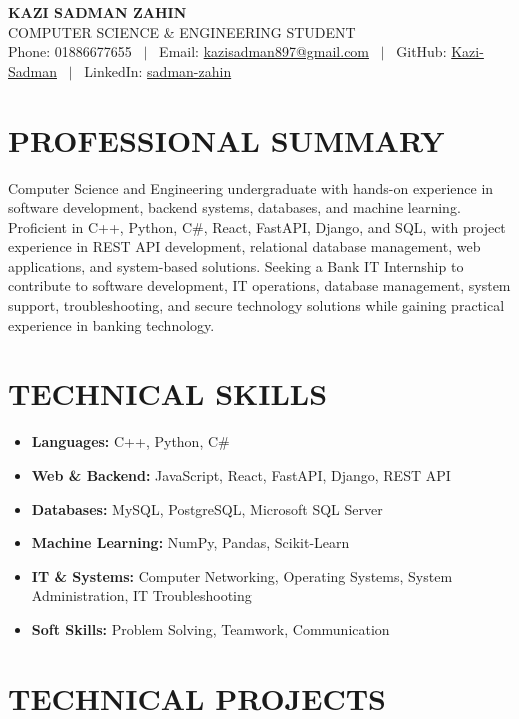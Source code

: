 \documentclass[9.5pt,a4paper]{article}
\newcommand{\resitem}[1]{\item #1}
\begin{document}
\begin{center}
    {\Huge \bfseries KAZI SADMAN ZAHIN} \\[1pt]
    {\large COMPUTER SCIENCE \& ENGINEERING STUDENT} \\[3pt]
    \small
    Phone: 01886677655 ~$|$~
    Email: \href{mailto:kazisadman897@gmail.com}{kazisadman897@gmail.com} ~$|$~
    GitHub: \href{https://github.com/Kazi-Sadman}{Kazi-Sadman} ~$|$~
    LinkedIn: \href{https://linkedin.com/in/sadman-zahin}{sadman-zahin}
\end{center}

\section*{PROFESSIONAL SUMMARY}
Computer Science and Engineering undergraduate with hands-on experience in software development, backend systems, databases, and machine learning. Proficient in C++, Python, C\#, React, FastAPI, Django, and SQL, with project experience in REST API development, relational database management, web applications, and system-based solutions. Seeking a Bank IT Internship to contribute to software development, IT operations, database management, system support, troubleshooting, and secure technology solutions while gaining practical experience in banking technology.


\section*{TECHNICAL SKILLS}
\begin{itemize}
    \resitem{\textbf{Languages:} C++, Python, C\#}
    \resitem{\textbf{Web \& Backend:} JavaScript, React, FastAPI, Django, REST API}
    \resitem{\textbf{Databases:} MySQL, PostgreSQL, Microsoft SQL Server}
    \resitem{\textbf{Machine Learning:} NumPy, Pandas, Scikit-Learn}
    \resitem{\textbf{IT \& Systems:}  Computer Networking, Operating Systems, System Administration, IT Troubleshooting}
    \resitem{\textbf{Soft Skills:} Problem Solving, Teamwork, Communication}
\end{itemize}

\section*{TECHNICAL PROJECTS}
\end{document}
